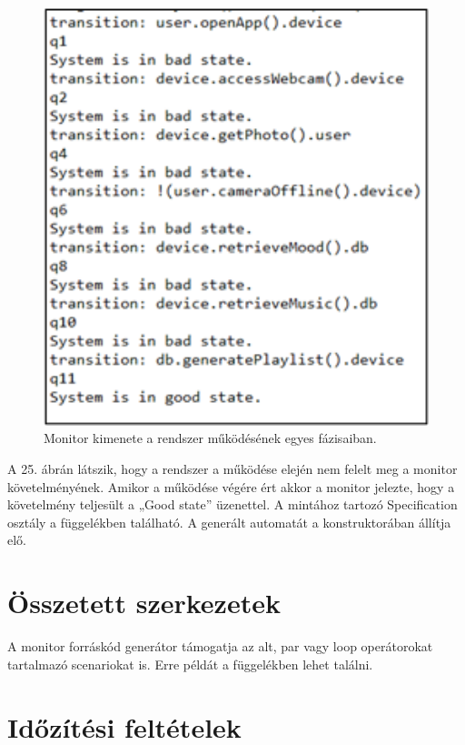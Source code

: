 \begin{figure}[!ht]
    \centering
    \includegraphics[width=150mm, keepaspectratio]{figures/23abra.png}
    \caption{Monitor kimenete a rendszer működésének egyes fázisaiban.}
\end{figure}
A 25. ábrán látszik, hogy a rendszer a működése elején nem felelt meg a monitor követelményének. Amikor a működése végére ért akkor a monitor jelezte, hogy a követelmény teljesült a „Good state” üzenettel. A mintához tartozó Specification osztály a függelékben található. A generált automatát a konstruktorában állítja elő.

\section{Összetett szerkezetek}

A monitor forráskód generátor támogatja az alt, par vagy loop operátorokat tartalmazó scenariokat is. Erre példát a függelékben lehet találni.

\section{Időzítési feltételek}

